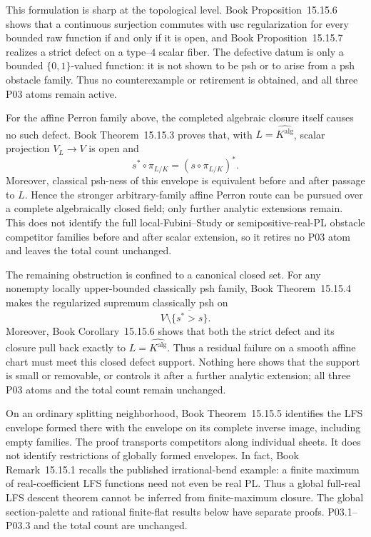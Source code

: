 \documentclass[11pt,a4paper]{article}
\theoremstyle{definition}
\theoremstyle{remark}
\begin{document}
This formulation is sharp at the topological level.
Book Proposition~15.15.6 shows that a continuous
surjection commutes with usc regularization for every bounded raw function
if and only if it is open, and
Book Proposition~15.15.7 realizes a strict defect on
a type--\(4\) scalar fiber.  The defective datum is only a bounded
\(\{0,1\}\)-valued function: it is not shown to be psh or to arise from a
psh obstacle family.  Thus no counterexample or retirement is obtained,
and all three P03 atoms remain active.

For the affine Perron family above, the completed algebraic closure itself
causes no such defect.
Book Theorem~15.15.3 proves that, with
\(L=\widehat{K^{\mathrm{alg}}}\), scalar
projection \(V_L\to V\) is open and
\[
       s^*\circ\pi_{L/K}=(s\circ\pi_{L/K})^*.
\]
Moreover, classical psh-ness of this envelope is equivalent before and
after passage to \(L\).  Hence the stronger arbitrary-family affine Perron
route can be pursued over a complete algebraically closed field; only
further analytic extensions remain.  This does not identify the full
local-Fubini--Study or semipositive-real-PL obstacle competitor families
before and after scalar extension, so it retires no P03 atom and leaves the
total count unchanged.

The remaining obstruction is confined to a canonical closed set.
For any nonempty locally upper-bounded classically psh family,
Book Theorem~15.15.4 makes the regularized supremum
classically psh on
\[
   V\setminus\overline{\{s^*>s\}}.
\]
Moreover,
Book Corollary~15.15.6 shows that both
the strict defect and its closure pull back exactly to
\(L=\widehat{K^{\mathrm{alg}}}\).  Thus a residual failure on a smooth affine
chart must meet this closed defect support.  Nothing here shows that the
support is small or removable, or controls it after a further analytic
extension; all three P03 atoms and the total count remain unchanged.

On an ordinary splitting neighborhood,
Book Theorem~15.15.5 identifies the LFS envelope formed
there with the envelope on its complete inverse image, including empty
families. The proof transports competitors along individual sheets. It
does not identify restrictions of globally formed envelopes. In fact,
Book Remark~15.15.1 recalls the published irrational-bend
example: a finite maximum of real-coefficient LFS functions need not even
be real PL. Thus a global full-real LFS descent theorem cannot be inferred
from finite-maximum closure. The global section-palette and rational
finite-flat results below have separate proofs. P03.1--P03.3 and the total
count are unchanged.
\end{document}
